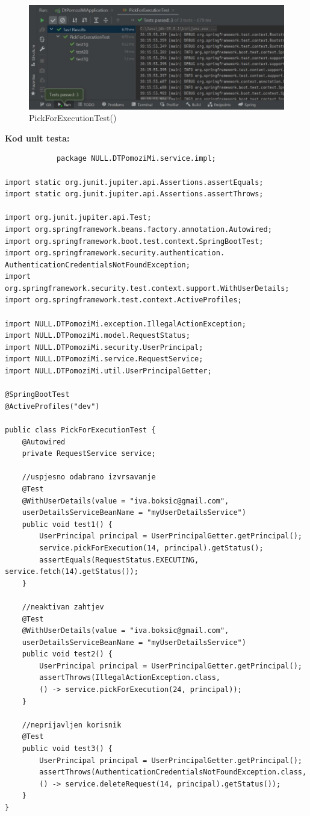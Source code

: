             \begin{figure}[H]
                 \includegraphics[width=\textwidth, height=\textheight, keepaspectratio]{slike/PickForExecutionTest.jpeg}
                \cntering
                \caption{PickForExecutionTest()}
            \end{figure}
            
            \noindent \textbf{Kod unit testa: }
            \begin{verbatim}
			package NULL.DTPomoziMi.service.impl;

import static org.junit.jupiter.api.Assertions.assertEquals;
import static org.junit.jupiter.api.Assertions.assertThrows;

import org.junit.jupiter.api.Test;
import org.springframework.beans.factory.annotation.Autowired;
import org.springframework.boot.test.context.SpringBootTest;
import org.springframework.security.authentication.
AuthenticationCredentialsNotFoundException;
import org.springframework.security.test.context.support.WithUserDetails;
import org.springframework.test.context.ActiveProfiles;

import NULL.DTPomoziMi.exception.IllegalActionException;
import NULL.DTPomoziMi.model.RequestStatus;
import NULL.DTPomoziMi.security.UserPrincipal;
import NULL.DTPomoziMi.service.RequestService;
import NULL.DTPomoziMi.util.UserPrincipalGetter;

@SpringBootTest
@ActiveProfiles("dev")

public class PickForExecutionTest {
	@Autowired
	private RequestService service;

	//uspjesno odabrano izvrsavanje
	@Test
	@WithUserDetails(value = "iva.boksic@gmail.com",
	userDetailsServiceBeanName = "myUserDetailsService")
	public void test1() {
		UserPrincipal principal = UserPrincipalGetter.getPrincipal();
		service.pickForExecution(14, principal).getStatus();
		assertEquals(RequestStatus.EXECUTING, service.fetch(14).getStatus());
	}

	//neaktivan zahtjev
	@Test
	@WithUserDetails(value = "iva.boksic@gmail.com",
	userDetailsServiceBeanName = "myUserDetailsService")
	public void test2() {
		UserPrincipal principal = UserPrincipalGetter.getPrincipal();
		assertThrows(IllegalActionException.class, 
		() -> service.pickForExecution(24, principal));
	}

	//neprijavljen korisnik
	@Test
	public void test3() {
		UserPrincipal principal = UserPrincipalGetter.getPrincipal();
		assertThrows(AuthenticationCredentialsNotFoundException.class, 
		() -> service.deleteRequest(14, principal).getStatus());
	}
}
			\end{verbatim}
			
